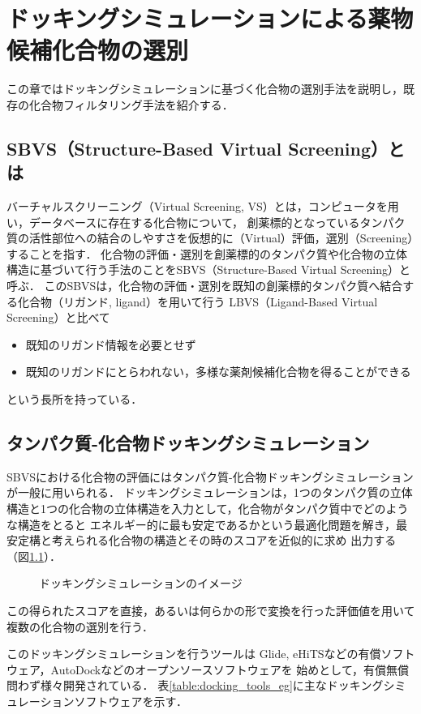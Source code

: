 \chapter{ドッキングシミュレーションによる薬物候補化合物の選別}
この章ではドッキングシミュレーションに基づく化合物の選別手法を説明し，既存の化合物フィルタリング手法を紹介する．

\section{SBVS（Structure-Based Virtual Screening）とは}
バーチャルスクリーニング（Virtual Screening, VS）とは，コンピュータを用い，データベースに存在する化合物について，
創薬標的となっているタンパク質の活性部位への結合のしやすさを仮想的に（Virtual）評価，選別（Screening）することを指す．
化合物の評価・選別を創薬標的のタンパク質や化合物の立体構造に基づいて行う手法のことをSBVS（Structure-Based Virtual Screening）と呼ぶ．
このSBVSは，化合物の評価・選別を既知の創薬標的タンパク質へ結合する化合物（リガンド, ligand）を用いて行う
LBVS（Ligand-Based Virtual Screening）と比べて
\begin{itemize}
\item 既知のリガンド情報を必要とせず
\item 既知のリガンドにとらわれない，多様な薬剤候補化合物を得ることができる
\end{itemize}
という長所を持っている．

\section{タンパク質-化合物ドッキングシミュレーション}
SBVSにおける化合物の評価にはタンパク質-化合物ドッキングシミュレーションが一般に用いられる．
ドッキングシミュレーションは，1つのタンパク質の立体構造と1つの化合物の立体構造を入力として，化合物がタンパク質中でどのような構造をとると
エネルギー的に最も安定であるかという最適化問題を解き，最安定構と考えられる化合物の構造とその時のスコアを近似的に求め
出力する（図\ref{fig:docking}）．
\begin{figure}[tb]
 \begin{center}
  \caption{ドッキングシミュレーションのイメージ}
  \label{fig:docking}
 \end{center}
\end{figure}
この得られたスコアを直接，あるいは何らかの形で変換を行った評価値を用いて複数の化合物の選別を行う．

このドッキングシミュレーションを行うツールは
Glide\cite{Friesner2004}, eHiTS\cite{Zsoldos2007}などの有償ソフトウェア，AutoDock\cite{Morris2009}などのオープンソースソフトウェアを
始めとして，有償無償問わず様々開発されている．
表\ref{table:docking_tools_eg}に主なドッキングシミュレーションソフトウェアを示す．

